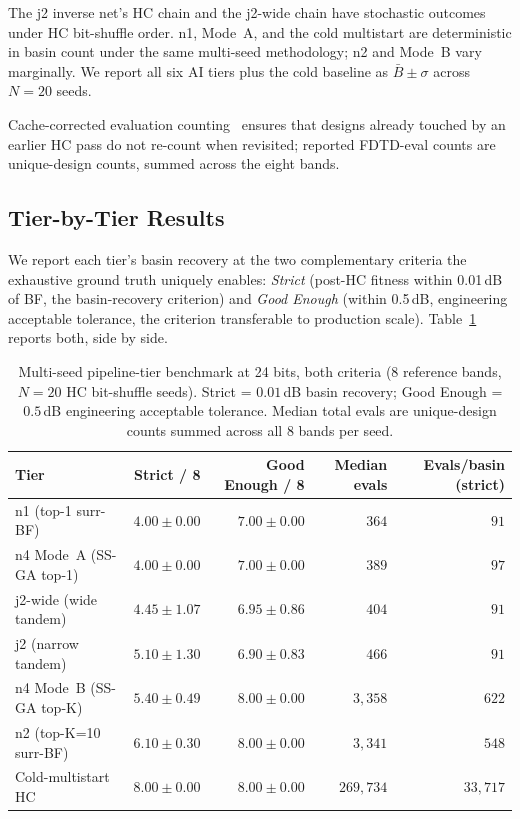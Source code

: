 The j2 inverse net's HC chain and the j2-wide chain have stochastic
outcomes under HC bit-shuffle order. n1, Mode~A, and the cold
multistart are deterministic in basin count under the same multi-seed
methodology; n2 and Mode~B vary marginally. We report all six AI tiers
plus the cold baseline as $\bar B \pm \sigma$ across $N{=}20$ seeds.

Cache-corrected evaluation counting~\cite{Maloney2013Genetic24bit}
ensures that designs already touched by an earlier HC pass do not
re-count when revisited; reported FDTD-eval counts are unique-design
counts, summed across the eight bands.

\subsection{Tier-by-Tier Results}\label{subsec:tier_results}

We report each tier's basin recovery at the two complementary
criteria the exhaustive ground truth uniquely enables: \emph{Strict}
(post-HC fitness within 0.01\,dB of BF, the basin-recovery criterion)
and \emph{Good Enough} (within 0.5\,dB, engineering acceptable
tolerance, the criterion transferable to production scale).
Table~\ref{tab:tier_summary} reports both, side by side.

\begin{table}[t]
\centering
\caption[Multi-seed pipeline-tier benchmark (24-bit)]{Multi-seed pipeline-tier benchmark at 24 bits, both criteria
(8 reference bands, $N{=}20$ HC bit-shuffle seeds). Strict =
$0.01$\,dB basin recovery; Good Enough = $0.5$\,dB engineering
acceptable tolerance. Median total evals are unique-design counts
summed across all 8 bands per seed.}
\label{tab:tier_summary}
\small
\begin{tabular}{lrrrr}
\toprule
Tier & Strict / 8 & Good Enough / 8 & Median evals & Evals/basin (strict) \\
\midrule
n1 (top-1 surr-BF)                     & $4.00 \pm 0.00$  & $7.00 \pm 0.00$ & $364$    & $91$ \\
n4 Mode~A (SS-GA top-1)                & $4.00 \pm 0.00$  & $7.00 \pm 0.00$ & $389$    & $97$ \\
j2-wide (wide tandem)                  & $4.45 \pm 1.07$  & $6.95 \pm 0.86$ & $404$    & $91$ \\
j2 (narrow tandem)                     & $5.10 \pm 1.30$  & $6.90 \pm 0.83$ & $466$    & $91$ \\
n4 Mode~B (SS-GA top-K)                & $5.40 \pm 0.49$  & $\mathbf{8.00 \pm 0.00}$ & $3{,}358$  & $622$ \\
n2 (top-K=10 surr-BF)                  & $6.10 \pm 0.30$  & $\mathbf{8.00 \pm 0.00}$ & $3{,}341$  & $548$ \\
Cold-multistart HC                     & $\mathbf{8.00 \pm 0.00}$ & $\mathbf{8.00 \pm 0.00}$ & $269{,}734$ & $33{,}717$ \\
\bottomrule
\end{tabular}
\end{table}

